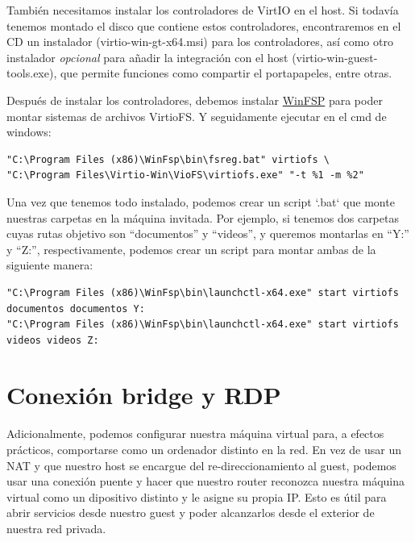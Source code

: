 \documentclass[11pt]{article}
\begin{document}
\vspace{5pt}

También necesitamos instalar los controladores de VirtIO en el host. Si todavía tenemos montado el disco que contiene estos controladores, encontraremos en el CD un instalador (virtio-win-gt-x64.msi) para los controladores, así como otro instalador \emph{opcional} para añadir la integración con el host (virtio-win-guest-tools.exe), que permite funciones como compartir el portapapeles, entre otras.

\vspace{5pt}

Después de instalar los controladores, debemos instalar \href{https://github.com/winfsp/winfsp}{WinFSP} para poder montar sistemas de archivos VirtioFS. Y seguidamente ejecutar en el cmd de windows:

\begin{verbatim}
"C:\Program Files (x86)\WinFsp\bin\fsreg.bat" virtiofs \
"C:\Program Files\Virtio-Win\VioFS\virtiofs.exe" "-t %1 -m %2"
\end{verbatim}

\vspace{5pt}

Una vez que tenemos todo instalado, podemos crear un script `.bat` que monte nuestras carpetas en la máquina invitada. Por ejemplo, si tenemos dos carpetas cuyas rutas objetivo son ``documentos'' y ``videos'', y queremos montarlas en ``Y:'' y ``Z:'', respectivamente, podemos crear un script para montar ambas de la siguiente manera:

\vspace{5pt}

\begin{lstlisting}[basicstyle=\scriptsize\ttfamily]
"C:\Program Files (x86)\WinFsp\bin\launchctl-x64.exe" start virtiofs documentos documentos Y:
"C:\Program Files (x86)\WinFsp\bin\launchctl-x64.exe" start virtiofs videos videos Z:
\end{lstlisting}

\section{Conexión bridge y RDP}

Adicionalmente, podemos configurar nuestra máquina virtual para, a efectos prácticos, comportarse como un ordenador distinto en la red. En vez de usar un NAT y que nuestro host se encargue del re-direccionamiento al guest, podemos usar una conexión puente y hacer que nuestro router reconozca nuestra máquina virtual como un dipositivo distinto y le asigne su propia IP. Esto es útil para abrir servicios desde nuestro guest y poder alcanzarlos desde el exterior de nuestra red privada.
\end{document}
